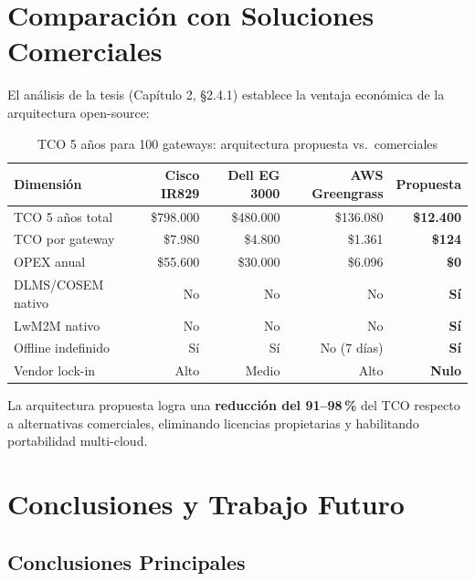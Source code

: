 \documentclass[11pt,a4paper]{article}
\begin{document}
\section{Comparación con Soluciones Comerciales}

El análisis de la tesis (Capítulo 2, §2.4.1) establece la ventaja económica de la arquitectura open-source:

\begin{table}[H]
\centering
\caption{TCO 5 años para 100 gateways: arquitectura propuesta vs.\ comerciales}
\label{tab:tco}
\begin{tabular}{l r r r r}
\toprule
\textbf{Dimensión} & \textbf{Cisco IR829} & \textbf{Dell EG 3000} & \textbf{AWS Greengrass} & \textbf{Propuesta} \\
\midrule
TCO 5 años total & \$798.000 & \$480.000 & \$136.080 & \textbf{\$12.400} \\
TCO por gateway & \$7.980 & \$4.800 & \$1.361 & \textbf{\$124} \\
OPEX anual & \$55.600 & \$30.000 & \$6.096 & \textbf{\$0} \\
DLMS/COSEM nativo & No & No & No & \textbf{Sí} \\
LwM2M nativo & No & No & No & \textbf{Sí} \\
Offline indefinido & Sí & Sí & No (7 días) & \textbf{Sí} \\
Vendor lock-in & Alto & Medio & Alto & \textbf{Nulo} \\
\bottomrule
\end{tabular}
\end{table}

\noindent La arquitectura propuesta logra una \textbf{reducción del 91--98\,\%} del TCO respecto a alternativas comerciales, eliminando licencias propietarias y habilitando portabilidad multi-cloud.

\section{Conclusiones y Trabajo Futuro}

\subsection{Conclusiones Principales}
\end{document}
